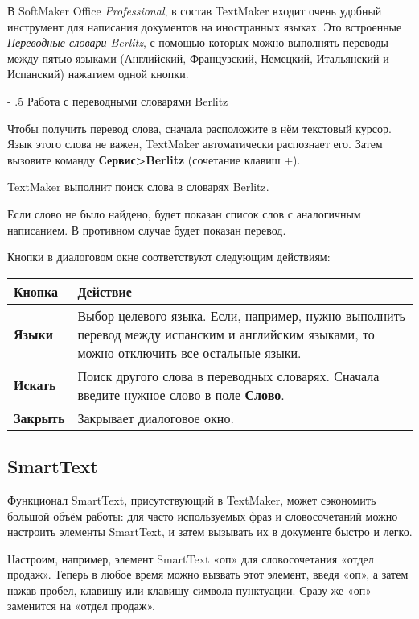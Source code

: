 ﻿\documentclass[a4paper,10pt]{article}
\makeatletter
\renewcommand\paragraph{%
   \@startsection{paragraph}{4}{0mm}%
      {-\baselineskip}%
      {.5\baselineskip}%
      {\normalfont\normalsize\bfseries}}
\makeatother
\begin{document}
В SoftMaker Office \textit{Professional}, в состав TextMaker входит очень удобный инструмент для написания документов на иностранных языках. Это встроенные \textit{Переводные словари Berlitz}, с помощью которых можно выполнять переводы между пятью языками (Английский, Французский, Немецкий, Итальянский и Испанский) нажатием одной кнопки.

\paragraph{Работа с переводными словарями Berlitz}

Чтобы получить перевод слова, сначала расположите в нём текстовый курсор. Язык этого слова не важен, TextMaker автоматически распознает его. Затем вызовите команду \textbf{Сервис>Berlitz} (сочетание клавиш +).

TextMaker выполнит поиск слова в словарях Berlitz.

Если слово не было найдено, будет показан список слов с аналогичным написанием. В противном случае будет показан перевод.

Кнопки в диалоговом окне соответствуют следующим действиям:

\begin{center}
\begin{tabular}{  m{4cm}  m{12cm}  }
 \textbf{Кнопка} & \textbf{Действие}\\ 
 \hline
  \textbf{Языки} & Выбор целевого языка. Если, например, нужно выполнить перевод между испанским и английским языками, то можно отключить все остальные языки.\\
  \textbf{Искать} & Поиск другого слова в переводных словарях. Сначала введите нужное слово в поле \textbf{Слово}.\\ 
\textbf{Закрыть} & Закрывает диалоговое окно.\\
\end{tabular}
\end{center}

\subsection{SmartText}
Функционал SmartText, присутствующий в TextMaker, может сэкономить большой объём работы: для часто используемых фраз и словосочетаний можно настроить элементы SmartText, и затем вызывать их в документе быстро и легко.

Настроим, например, элемент SmartText «оп» для словосочетания «отдел продаж». Теперь в любое время можно вызвать этот элемент, введя «оп», а затем нажав пробел, клавишу  или клавишу символа пунктуации. Сразу же «оп» заменится на «отдел продаж».
\end{document}
